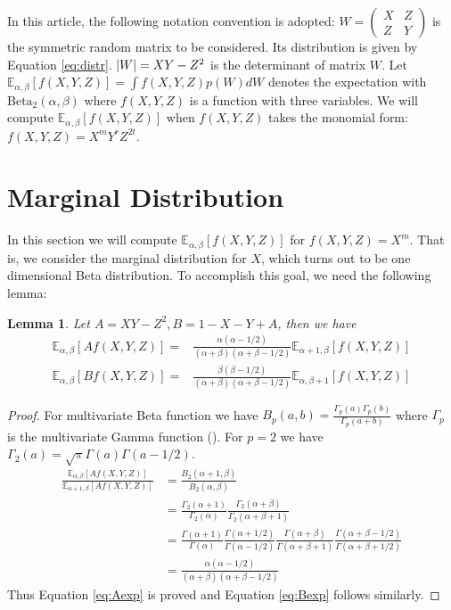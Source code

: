 \documentclass[review,authoryear]{elsarticle}
\DeclarePairedDelimiter\abs{\lvert}{\rvert}
\def\E{\mathbb{E}}
\def\Beta{\textrm{Beta}}
\newtheorem{lemma}{Lemma}
\begin{document}
In this article, the following notation convention is adopted:
$W=\begin{pmatrix} X & Z \\ Z & Y \end{pmatrix}$ is the symmetric random
matrix to be considered. Its distribution is given by Equation \eqref{eq:distr}.
$\abs{W}=XY-Z^2$ is the determinant of matrix $W$.
Let $\E_{\alpha,\beta}[f(X,Y, Z)] = \int f(X,Y,Z)p(W)dW$ denotes the expectation
with $\Beta_2(\alpha, \beta)$ where $f(X, Y, Z)$ is a function with three
variables. We will compute $\E_{\alpha,\beta}[f(X,Y, Z)]$
when $f(X,Y,Z)$ takes the monomial form: $f(X,Y,Z)=X^m Y^r Z^{2t}$.

\section{Marginal Distribution}
In this section we will compute $\E_{\alpha,\beta}[f(X,Y, Z)]$
for $f(X,Y,Z)=X^m$. That is, we consider the marginal distribution for $X$,
which turns out to be one dimensional Beta distribution.
To accomplish this goal, we need the following lemma:
\begin{lemma}\label{lem:AB}
Let $A = XY - Z^2, B = 1 - X - Y + A$, then we have
\begin{align}
\E_{\alpha, \beta}[Af(X,Y,Z)] =&
\frac{\alpha(\alpha-1/2)}{(\alpha+\beta)(\alpha+\beta-1/2)}\E_{\alpha+1, \beta}[f(X,Y,Z)]
\label{eq:Aexp} \\
\E_{\alpha,\beta}[Bf(X,Y,Z)] =&
\frac{\beta(\beta-1/2)}{(\alpha+\beta)(\alpha+\beta-1/2)}\E_{\alpha, \beta+1}[f(X,Y,Z)]
\label{eq:Bexp}
\end{align}
\end{lemma}
\begin{proof}
For multivariate Beta function we have
$B_p(a, b) = \frac{\Gamma_p(a)\Gamma_p(b)}{\Gamma_p(a+b)}$
where $\Gamma_p$ is the multivariate Gamma function (\cite{ingham_1933}).
For $p=2$ we have $\Gamma_2(a) = \sqrt{\pi}\Gamma(a)\Gamma(a-1/2)$.
\begin{align*}
\frac{\E_{\alpha, \beta}[Af(X,Y,Z)]}{\E_{\alpha+1, \beta}[Af(X,Y,Z)]} &
=\frac{B_2(\alpha+1,\beta)}{B_2(\alpha,\beta)}\\
&=\frac{\Gamma_2(\alpha+1)}{\Gamma_2(\alpha)}
\frac{\Gamma_2(\alpha+\beta)}{\Gamma_2(\alpha+\beta+1)}\\
& =\frac{\Gamma(\alpha+1)}{\Gamma(\alpha)}
\frac{\Gamma(\alpha+1/2)}{\Gamma(\alpha-1/2)}
\frac{\Gamma(\alpha+\beta)}{\Gamma(\alpha+\beta+1)}
\frac{\Gamma(\alpha+\beta-1/2)}{\Gamma(\alpha+\beta+1/2)}\\
&=\frac{\alpha(\alpha-1/2)}{(\alpha+\beta)(\alpha+\beta-1/2)}
\end{align*}
Thus Equation \eqref{eq:Aexp} is proved and Equation \eqref{eq:Bexp} follows similarly.
\end{proof}
\end{document}
